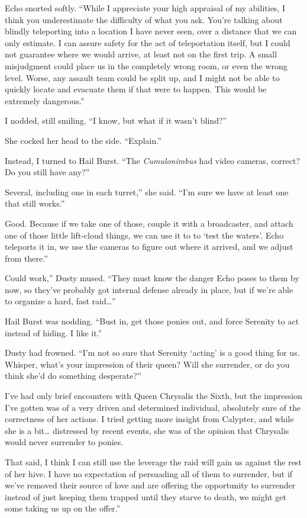 Echo snorted softly. “While I appreciate your high appraisal of my abilities, I think you underestimate the difficulty of what you ask. You’re talking about blindly teleporting into a location I have never seen, over a distance that we can only estimate. I can assure safety for the act of teleportation itself, but I could not guarantee where we would arrive, at least not on the first trip. A small misjudgment could place us in the completely wrong room, or even the wrong level. Worse, any assault team could be split up, and I might not be able to quickly locate and evacuate them if that were to happen. This would be extremely dangerous.”

I nodded, still smiling. “I know, but what if it wasn’t blind?”

She cocked her head to the side. “Explain.”

Instead, I turned to Hail Burst. “The \textit{Cumulonimbus} had video cameras, correct? Do you still have any?”

\leavevmode{}Several, including one in each turret,” she said. “I’m sure we have at least one that still works.”

\leavevmode{}Good. Because if we take one of those, couple it with a broadcaster, and attach one of those little lift-cloud things, we can use it to to ‘test the waters’. Echo teleports it in, we use the cameras to figure out where it arrived, and we adjust from there.”

\leavevmode{}Could work,” Dusty mused. “They must know the danger Echo poses to them by now, so they’ve probably got internal defense already in place, but if we’re able to organize a hard, fast raid…”

Hail Burst was nodding. “Bust in, get those ponies out, and force Serenity to act instead of hiding. I like it.”

Dusty had frowned. “I’m not so sure that Serenity ‘acting’ is a good thing for us. Whisper, what’s your impression of their queen? Will she surrender, or do you think she’d do something desperate?”

\leavevmode{}I’ve had only brief encounters with Queen Chrysalis the Sixth, but the impression I’ve gotten was of a very driven and determined individual, absolutely sure of the correctness of her actions. I tried getting more insight from Calypter, and while she is a bit… distressed by recent events, she was of the opinion that Chrysalis would never surrender to ponies.

\leavevmode{}That said, I think I can still use the leverage the raid will gain us against the rest of her hive. I have no expectation of persuading all of them to surrender, but if we’ve removed their source of love and are offering the opportunity to surrender instead of just keeping them trapped until they starve to death, we might get some taking us up on the offer.”

